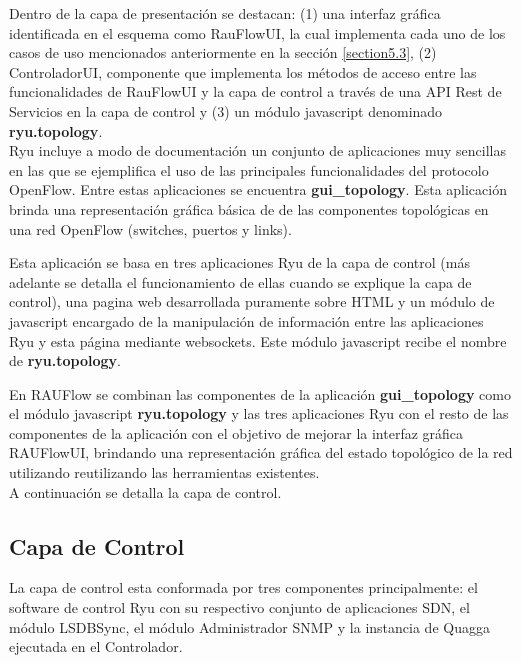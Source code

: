 Dentro de la capa de presentaci\'on se destacan: (1) una interfaz gr\'afica identificada en el esquema como RauFlowUI, la cual implementa cada uno de los casos de uso mencionados anteriormente en la secci\'on \ref{section5.3}, (2) ControladorUI, componente que implementa los m\'etodos de acceso entre las funcionalidades de RauFlowUI y la capa de control a trav\'es de una API Rest de Servicios en la capa de control y (3) un m\'odulo javascript denominado \textbf{ryu.topology}.\\ 

Ryu incluye a modo de documentaci\'on un conjunto de aplicaciones muy sencillas en las que se ejemplifica el uso de las principales funcionalidades del protocolo OpenFlow. Entre estas aplicaciones se encuentra \textbf{gui\_topology}. Esta aplicaci\'on brinda una representaci\'on gr\'afica b\'asica de de las componentes topol\'ogicas en una red OpenFlow (switches, puertos y links).

Esta aplicaci\'on se basa en tres aplicaciones Ryu de la capa de control (m\'as adelante se detalla el funcionamiento de ellas cuando se explique la capa de control), una pagina web desarrollada puramente sobre HTML y un m\'odulo de javascript encargado de la manipulaci\'on de informaci\'on entre las aplicaciones Ryu y esta p\'agina mediante websockets. Este m\'odulo javascript recibe el nombre de \textbf{ryu.topology}.

En RAUFlow se combinan las componentes de la aplicaci\'on \textbf{gui\_topology} como el m\'odulo javascript \textbf{ryu.topology} y las tres aplicaciones Ryu con el resto de las componentes de la aplicaci\'on con el objetivo de mejorar la interfaz gr\'afica RAUFlowUI, brindando una representaci\'on gr\'afica del estado topol\'ogico de la red utilizando reutilizando las herramientas existentes.\\
 
A continuaci\'on se detalla la capa de control.

\subsection{Capa de Control}

La capa de control esta conformada por tres componentes principalmente: el software de control Ryu con su respectivo conjunto de aplicaciones SDN, el m\'odulo LSDBSync, el m\'odulo Administrador SNMP y la instancia de Quagga ejecutada en el Controlador.\\

 

